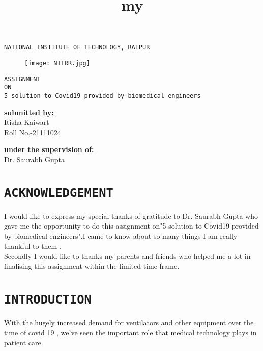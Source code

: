 \documentclass[12pt]{article}
\title{my}
\begin{document}
\centering\huge\texttt{NATIONAL INSTITUTE OF TECHNOLOGY, RAIPUR}\\

\begin{figure}[h]
\centering
\texttt{[image: NITRR.jpg]}
\end{figure}

\begin{center}


\huge\texttt{ASSIGNMENT \\ON\\ 5 solution to Covid19 provided by biomedical engineers}

\end{center}

\begin{minipage}[t]{5cm}
\flushleft\Large\textbf{\underline{submitted by:}}\\
Itisha Kaiwart\\
Roll No.-21111024
\end{minipage}
\hfill
\begin{minipage}[t]{5cm}
\Large\textbf{\underline{under the supervision of:}}\\
Dr. Saurabh Gupta
\end{minipage}


\pagebreak
\tableofcontents
\pagebreak

\section{\Large\centering\texttt{ACKNOWLEDGEMENT}}

\large \flushleft I would like to express my special thanks of gratitude to Dr. Saurabh Gupta who gave me the opportunity to do this assignment on"5 solution to Covid19 provided by biomedical engineers".I came to know about so many things I am really thankful to them .\\



\vspace{1cm}
Secondly I would like to thanks my parents and friends who helped me a lot in finalising this assignment within the limited time frame.

\pagebreak



\section{\Large\centering\texttt{INTRODUCTION}}
With the hugely increased demand for ventilators and other equipment over the time of covid 19 , we’ve seen the important role that medical technology plays in patient care.\\
\end{document}
